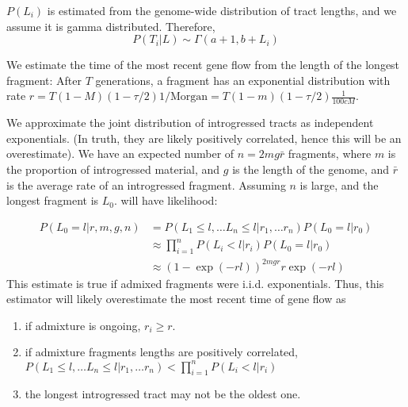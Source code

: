 \documentclass[10pt,a4paper]{article}
\begin{document}
$P(L_i)$ is estimated from the genome-wide distribution of tract lengths, and we assume it is gamma distributed. Therefore,
\begin{equation}
P(T_i | L) \sim \Gamma(a+1, b+L_i)
\end{equation}

We estimate the time of the most recent gene flow from the length of the longest fragment:
After $T$ generations, a fragment has an exponential distribution with rate $r=T(1-M)(1-\tau/2) 1/\text{Morgan} = T(1-m) (1-\tau/2)\frac{1}{100 cM}$.

We approximate the joint distribution of introgressed tracts as independent exponentials. (In truth, they are likely positively correlated, hence this will be an overestimate). We have an expected number of $n=2mg\bar{r}$ fragments, where $m$ is the proportion of introgressed material, and $g$ is the length of the genome, and $\bar{r}$ is the average rate of an introgressed fragment. Assuming $n$ is large, and the longest fragment is $L_0$. will have likelihood:  

\begin{align}
P(L_0=l | r, m, g, n) 
&= P(L_1 \leq l, \dots L_n \leq l | r_1, \dots r_n) P(L_0 = l | r_0)\nonumber\\
&\approx \prod_{i=1}^n P(L_i < l| r_i) P(L_0 = l | r_0)\nonumber\\
&\approx (1- \exp( -r l ))^{2m g r} r \exp ( -r l)
\end{align}
This estimate is true if admixed fragments were i.i.d. exponentials. Thus, this estimator will likely overestimate the most recent time of gene flow as
\begin{enumerate}
	\item if admixture is ongoing, $r_i \geq r$.
	\item if admixture fragments lengths are positively correlated, $P(L_1 \leq l, \dots L_n \leq l | r_1, \dots r_n) < \prod_{i=1}^n P(L_i < l| r_i)$
	\item the longest introgressed tract may not be the oldest one.
\end{enumerate}
\end{document}
